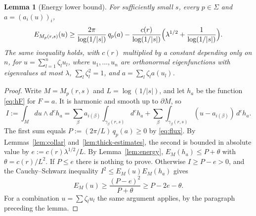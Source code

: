 \documentclass[11pt]{amsart}
\newtheorem{lemma}[theorem]{Lemma}
\theoremstyle{definition}
\theoremstyle{remark}
\newcommand{\dc}{d^c}
\begin{document}
\begin{lemma}[Energy lower bound]\label{lem:capacity}
For sufficiently small $s$, every $p\in\Sigma$ and $a=(a_i(u))_i$,
\[
 E_{M_p(r,s)}(u)\ge\frac{2\pi}{\log(1/|s|)}\,q_p(a)
 -\frac{c(r)}{\log(1/|s|)}\Bigl(\lambda^{1/2}+\frac1{\log(1/|s|)}\Bigr).
\]
The same inequality holds, with $c(r)$ multiplied by a constant depending
only on $n$, for $u=\sum_{l=1}^n\zeta_lu_l$, where $u_1,\ldots,u_n$ are
orthonormal eigenfunctions with eigenvalues at most $\lambda$,
$\sum_l\zeta_l^2=1$, and $a=\sum_l\zeta_la(u_l)$.
\end{lemma}
\begin{proof}
Write $M=M_p(r,s)$ and $L=\log(1/|s|)$, and let $h_a$ be the function
\eqref{eq:hF} for $F=a$. It is harmonic and smooth up to $\partial M$, so
\[
 I:=\int_Mdu\wedge\dc h_a
 =\sum_\beta a_{i(\beta)}\int_{\gamma_\beta(r,s)}\dc h_a
 +\sum_\beta\int_{\gamma_\beta(r,s)}(u-a_{i(\beta)})\,\dc h_a .
\]
The first sum equals $P:=(2\pi/L)\,q_p(a)\ge0$ by \eqref{eq:flux}. By
Lemmas~\ref{lem:collar} and~\ref{lem:thick-estimates}, the second is
bounded in absolute value by $e:=c(r)\lambda^{1/2}/L$. By
Lemma~\ref{lem:energy}, $E_M(h_a)\le P+\theta$ with
$\theta=c(r)/L^2$. If $P\le e$ there is nothing to prove. Otherwise
$I\ge P-e>0$, and the Cauchy--Schwarz inequality
$I^2\le E_M(u)E_M(h_a)$ gives
\[
 E_M(u)\ge\frac{(P-e)^2}{P+\theta}\ge P-2e-\theta .
\]
For a combination $u=\sum\zeta_lu_l$ the same argument applies, by the
paragraph preceding the lemma.
\end{proof}
\end{document}
